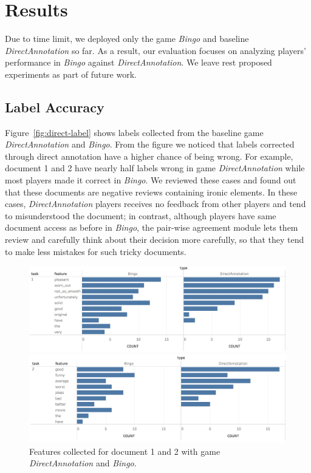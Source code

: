 \documentclass[chi_draft]{sigchi}
\begin{document}
\section{Results}

Due to time limit, we deployed only the game \emph{Bingo} and baseline \emph{DirectAnnotation} so far. As a result, our evaluation focuses on analyzing players' performance in \emph{Bingo} against \emph{DirectAnnotation}. We leave rest proposed experiments as part of future work.

\subsection{Label Accuracy}

Figure~\ref{fig:direct-label} shows labels collected from the baseline game \emph{DirectAnnotation} and \emph{Bingo}. From the figure we noticed that labels corrected through direct annotation have a higher chance of being wrong. For example, document 1 and 2 have nearly half labels wrong in game \emph{DirectAnnotation} while most players made it correct in \emph{Bingo}. We reviewed these cases and found out that these documents are negative reviews containing ironic elements. In these cases, \emph{DirectAnnotation} players receives no feedback from other players and tend to misunderstood the document; in contrast, although players have same document access as before in \emph{Bingo}, the pair-wise agreement module lets them review and carefully think about their decision more carefully, so that they tend to make less mistakes for such tricky documents.


\begin{figure}[t]
\includegraphics[width=\linewidth]{figures/feature-doc-1}

\includegraphics[width=\linewidth]{figures/feature-doc-2}
\caption{Features collected for document 1 and 2 with game \emph{DirectAnnotation} and \emph{Bingo}.}
\label{fig:feature}
\end{figure}
\end{document}
